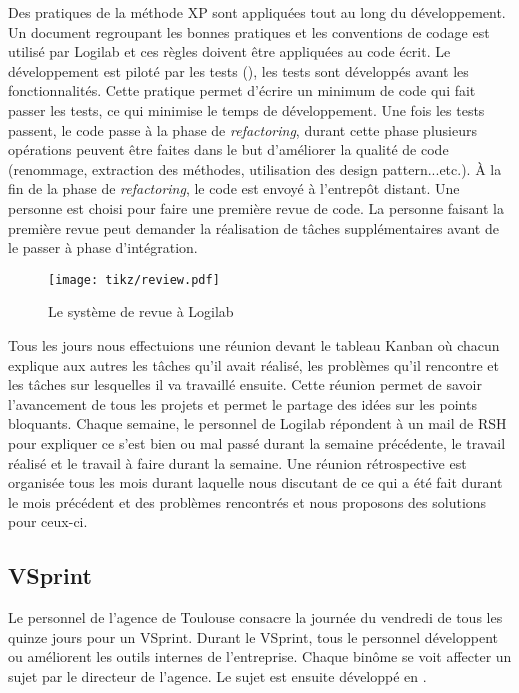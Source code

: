 Des pratiques de la méthode XP sont appliquées tout au long du développement. Un document regroupant les bonnes pratiques et les conventions de codage est utilisé par Logilab et ces règles doivent être appliquées au code écrit. Le développement est piloté par les tests (), les tests sont développés avant les fonctionnalités. Cette pratique permet d'écrire un minimum de code qui fait passer les tests, ce qui minimise le temps de développement. Une fois les tests passent, le code passe à la phase de \textit{refactoring}, durant cette phase plusieurs opérations peuvent être faites dans le but d'améliorer la qualité de code (renommage, extraction des méthodes, utilisation des design pattern...etc.). \`A la fin de la phase de \textit{refactoring}, le code est envoyé à l’entrepôt distant. Une personne est choisi pour faire une première revue de code. La personne faisant la première revue peut demander la réalisation de tâches supplémentaires avant de le passer à phase d'intégration. 

\begin{figure}
\centering
  \texttt{[image: tikz/review.pdf]}
  \caption{Le système de revue à Logilab}
  \label{fig:review}
\end{figure}

Tous les jours nous effectuions une réunion devant le tableau Kanban où chacun explique aux autres les tâches qu'il avait réalisé, les problèmes qu'il rencontre et les tâches sur lesquelles il va travaillé ensuite. Cette réunion permet de savoir l'avancement de tous les projets et permet le partage des idées sur les points bloquants. Chaque semaine, le personnel de Logilab répondent à un mail de RSH pour expliquer ce s'est bien ou mal passé durant la semaine précédente, le travail réalisé et le travail à faire durant la semaine. Une réunion rétrospective est organisée tous les mois durant laquelle nous discutant de ce qui a été fait durant le mois précédent et des problèmes rencontrés et nous proposons des solutions pour ceux-ci. 

\subsection{VSprint}
Le personnel de l'agence de Toulouse consacre la journée du vendredi de tous les quinze jours pour un VSprint. Durant le VSprint, tous le personnel développent ou améliorent les outils internes de l'entreprise. Chaque binôme se voit affecter un sujet par le directeur de l'agence. Le sujet est ensuite développé en .

